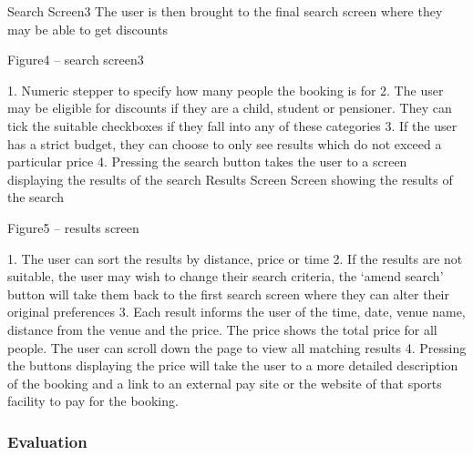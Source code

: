 Search Screen3
The user is then brought to the final search screen where they may be able to get discounts

Figure4 – search screen3

1.       Numeric stepper to specify how many people the booking is for
2.       The user may be eligible for discounts if they are a child, student or pensioner. They can tick the suitable checkboxes if they fall into any of these categories
3.       If the user has a strict budget, they can choose to only see results which do not exceed a  particular price
4.       Pressing the search button takes the user to a screen displaying the results of the search
Results Screen
Screen showing the results of the search

Figure5 – results screen

1.       The user can sort the results by distance, price or time
2.       If the results are not suitable, the user may wish to change their search criteria, the ‘amend search’ button will take them back to the first search screen where they can alter their original preferences
3.       Each result informs the user of the time, date, venue name, distance from the venue and the price. The price shows the total price for all people. The user can scroll down the page to view all matching results
4.       Pressing the buttons displaying the price will take the user to a more detailed description of the booking and a link to an external pay site or the website of that sports facility to pay for the booking.

\subsubsection{Evaluation}

